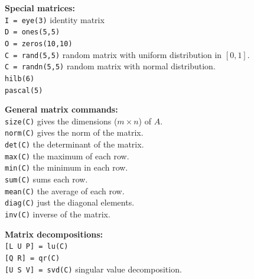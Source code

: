 {\bf Special matrices:}\\
\verb&I = eye(3)& \dotfill identity matrix\\
\verb&D = ones(5,5)&\\
\verb&O = zeros(10,10)&\\
\verb&C = rand(5,5)& \dotfill random matrix with uniform
         distribution in $[0,1]$.\\
\verb&C = randn(5,5)& \dotfill random matrix with normal distribution.\\
\verb&hilb(6)&\\
\verb&pascal(5)&


{\bf General matrix commands:}\\
\verb&size(C)& \dotfill gives the dimensions ($m \times n$) of $A$.\\
\verb&norm(C)& \dotfill gives the norm of the matrix.\\
\verb&det(C)&   \dotfill the determinant of the matrix.\\
\verb&max(C)&   \dotfill the maximum of each row.\\
\verb&min(C)&   \dotfill the minimum in each row.\\
\verb&sum(C)&   \dotfill sums each row.\\
\verb&mean(C)&   \dotfill the average of each row.\\
\verb&diag(C)&   \dotfill just the diagonal elements. \\
\verb&inv(C)&    \dotfill inverse of the matrix.


{\bf Matrix decompositions:}\\
\verb&[L U P] = lu(C)&\\
\verb&[Q R] = qr(C)&\\
\verb&[U S V] = svd(C)& \dotfill singular value decomposition.





